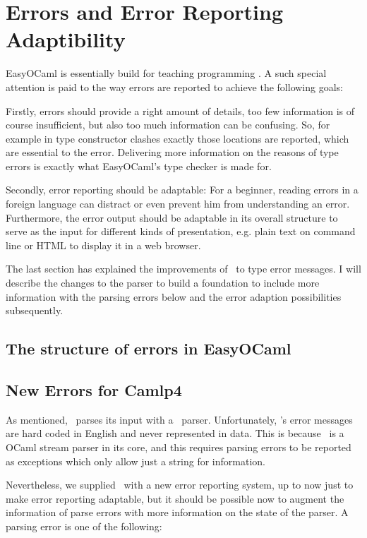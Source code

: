 
\section{Errors and Error Reporting Adaptibility}
\label{sec:errors}

EasyOCaml is essentially build for teaching programming . A such special
attention is paid to the way errors are reported to achieve the following
goals:

Firstly, errors should provide a right amount of details, too few information
is of course insufficient, but also too much information can be confusing. So,
for example in type constructor clashes exactly those locations are reported,
which are essential to the error.  Delivering more information on the reasons
of type errors is exactly what EasyOCaml's type checker is made for.

Secondly, error reporting should be adaptable: For a beginner, reading 
errors in a foreign language can distract or even prevent him from 
understanding an error. Furthermore, the error output should be adaptable in
its overall structure to serve as the input for different kinds of
presentation, e.g. plain text on command line or HTML to display it in a web
browser.

The last section has explained the improvements of \easyocaml\ to type 
error messages. I will describe the changes to the parser to build a foundation
to include more information with the parsing errors below and the error
adaption possibilities subsequently.

\subsection{The structure of errors in EasyOCaml}
\label{sec:easyerrors}


\subsection{New Errors for Camlp4}
\label{hd003001}
As mentioned, \easyocaml\ parses its input with a \camlpf\ parser.  
Unfortunately, \camlpf's error messages are hard coded in English and never
represented in data.  This is because \camlpf\ is a OCaml stream parser in its
core, and this requires parsing errors to be reported as exceptions which only
allow just a string for information.

Nevertheless, we supplied \camlpf\ with a new error reporting system, up 
to now just to make error reporting adaptable, but it should be possible 
now to augment the information of parse errors with more information on the
state of the parser. A parsing error is one of
the following:

